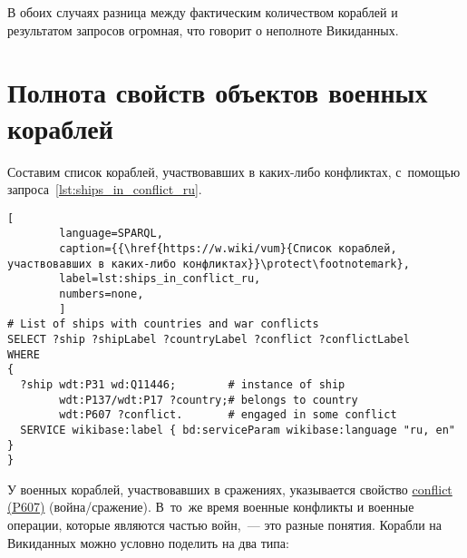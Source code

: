 В обоих случаях разница между фактическим количеством кораблей и результатом запросов огромная, что говорит о неполноте Викиданных.






\section{Полнота свойств объектов военных кораблей}

Составим список кораблей, участвовавших в каких-либо конфликтах, 
с~помощью запроса~\ref{lst:ships_in_conflict_ru}.

\begin{lstlisting}[ 
        language=SPARQL, 
        caption={{\href{https://w.wiki/vum}{Список кораблей, участвовавших в каких-либо конфликтах}}\protect\footnotemark}, 
        label=lst:ships_in_conflict_ru, 
        numbers=none,
        ]
# List of ships with countries and war conflicts
SELECT ?ship ?shipLabel ?countryLabel ?conflict ?conflictLabel
WHERE
{
  ?ship wdt:P31 wd:Q11446;        # instance of ship
        wdt:P137/wdt:P17 ?country;# belongs to country
        wdt:P607 ?conflict.       # engaged in some conflict
  SERVICE wikibase:label { bd:serviceParam wikibase:language "ru, en" }
}
\end{lstlisting}



\newpage
У военных кораблей, участвовавших в сражениях, 
указывается свойство 
\href{https://www.wikidata.org/wiki/Property:P607}{conflict (P607)} (война/сражение). 
В~то~же время военные конфликты и военные операции, 
которые являются частью войн,~--- это разные понятия. 
Корабли на Викиданных можно условно поделить на два типа:

